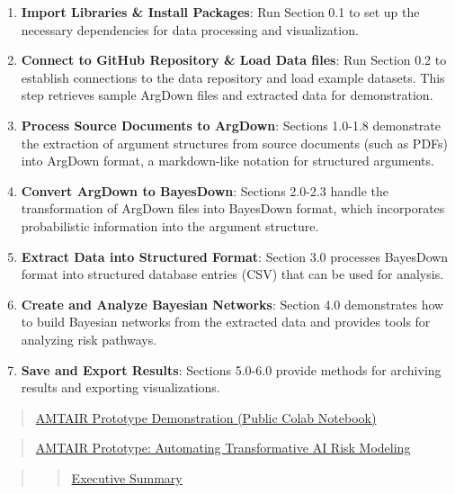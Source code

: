 \documentclass[
  11pt,
  letterpaper,
]{book}
\begin{document}
\begin{enumerate}
\def\labelenumi{\arabic{enumi}.}
\item
  \textbf{Import Libraries \& Install Packages}: Run Section 0.1 to set
  up the necessary dependencies for data processing and visualization.
\item
  \textbf{Connect to GitHub Repository \& Load Data files}: Run Section
  0.2 to establish connections to the data repository and load example
  datasets. This step retrieves sample ArgDown files and extracted data
  for demonstration.
\item
  \textbf{Process Source Documents to ArgDown}: Sections 1.0-1.8
  demonstrate the extraction of argument structures from source
  documents (such as PDFs) into ArgDown format, a markdown-like notation
  for structured arguments.
\item
  \textbf{Convert ArgDown to BayesDown}: Sections 2.0-2.3 handle the
  transformation of ArgDown files into BayesDown format, which
  incorporates probabilistic information into the argument structure.
\item
  \textbf{Extract Data into Structured Format}: Section 3.0 processes
  BayesDown format into structured database entries (CSV) that can be
  used for analysis.
\item
  \textbf{Create and Analyze Bayesian Networks}: Section 4.0
  demonstrates how to build Bayesian networks from the extracted data
  and provides tools for analyzing risk pathways.
\item
  \textbf{Save and Export Results}: Sections 5.0-6.0 provide methods for
  archiving results and exporting visualizations.
\end{enumerate}

\begin{quote}
\hyperref[scrollTo=lt8-AnebGUXrux26uniqifier=1]{AMTAIR Prototype
Demonstration (Public Colab Notebook)}
\end{quote}

\begin{quote}
\hyperref[scrollTo=iDy_leH6DJH_ux26uniqifier=1]{AMTAIR Prototype:
Automating Transformative AI Risk Modeling}
\end{quote}

\begin{quote}
\begin{quote}
\hyperref[scrollTo=iDy_leH6DJH_ux26uniqifier=1]{Executive Summary}
\end{quote}
\end{quote}
\end{document}
